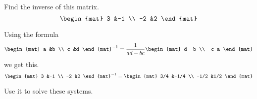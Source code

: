 \documentclass[noanswers, nolegalese, 11pt]{examjh}
\begin{document}
\thispagestyle{empty}
\vspace{-1ex}
\makebox[\textwidth]{\hbox{}\hrulefill\hbox{}}


\begin{questions}
\question
Find the inverse of this matrix.
\begin{equation*}
\begin{mat}
  3  &-1  \\
 -2  &2
\end{mat}
\end{equation*}
\begin{solution}
Using the formula
\begin{equation*}
\begin{mat}
  a  &b  \\
  c  &d  
\end{mat}^{-1}
=\frac{1}{ad-bc}
\begin{mat}
  d  -b  \\
 -c  a
\end{mat}
\end{equation*}
we get this.
\begin{equation*}
\begin{mat}
  3  &-1  \\
 -2  &2
\end{mat}^{-1}
=
\begin{mat}
  3/4  &-1/4 \\
 -1/2  &1/2
\end{mat}
\end{equation*}
\end{solution}
Use it to solve these systems.
\begin{parts}

\end{parts}
\end{questions}
\end{document}
